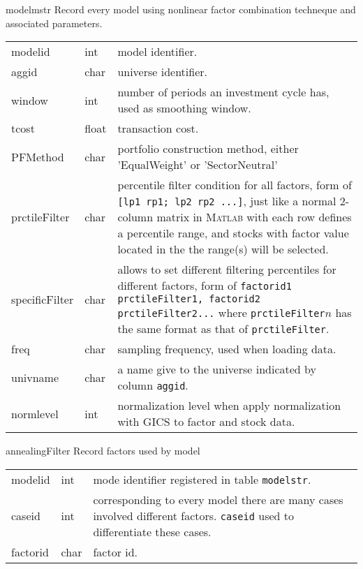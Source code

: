 \documentclass[10pt,oneside,a4paper]{article}
\newcommand{\matlab}{{\textsc{Matlab}}}
\begin{document}
\begin{argdesc}
  \item [modelmstr] Record every model using nonlinear factor combination techneque and associated parameters.

     \begin{tabular}{>{\ttfamily}l<{} l p{11cm}}
     modelid & int  & model identifier. \\
     aggid   & char & universe identifier. \\
     window  & int  & number of periods an investment cycle has, used as smoothing window. \\
     tcost   & float & transaction cost. \\
     PFMethod & char &  portfolio construction method, either 'EqualWeight' or 'SectorNeutral'\\
     prctileFilter & char & percentile filter condition for all factors, form of \texttt{[lp1 rp1; lp2 rp2 ...]},
             just like a normal 2-column matrix in \matlab{} with each row defines a percentile range,
             and stocks with factor value located in the the range(s) will be selected. \\
     specificFilter & char & allows to set different filtering percentiles for different factors, form of
            \texttt{factorid1 prctileFilter1, factorid2 prctileFilter2...} where \texttt{prctileFilter}$n$
            has the same format as that of \texttt{prctileFilter}.\\
     freq     & char & sampling frequency, used when loading data.\\
     univname & char & a name give to the universe indicated by column \texttt{aggid}.\\
     normlevel & int & normalization level when apply normalization with GICS to factor and stock data. \\
     \end{tabular}

  \item [annealingFilter] Record factors used by model

     \begin{tabular}{>{\ttfamily}l<{} l p{11cm}}
     modelid & int & mode identifier registered in table \texttt{modelstr}.\\
     caseid  & int & corresponding to every model there are many cases involved different factors.
              \texttt{caseid} used to differentiate these cases. \\
     factorid & char & factor id.\\
     \end{tabular}
   

\end{argdesc}
\end{document}
